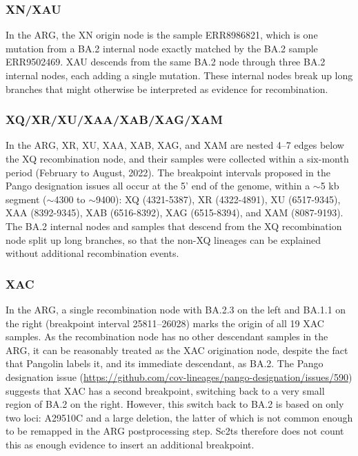 \documentclass[12pt]{article}
\begin{document}
\subsubsection{XN/XAU}
\label{sec:dd_xn}

In the ARG, the XN origin node is the sample ERR8986821,
which is one mutation from a BA.2 internal node
exactly matched by the BA.2 sample ERR9502469.
XAU descends from the same BA.2 node through three BA.2 internal nodes,
each adding a single mutation.
These internal nodes break up long branches
that might otherwise be interpreted as evidence for recombination.

\subsubsection{XQ/XR/XU/XAA/XAB/XAG/XAM}
\label{sec:dd_xq}

In the ARG, XR, XU, XAA, XAB, XAG, and XAM
are nested 4--7 edges below the XQ recombination node,
and their samples were collected within a six-month period (February to August, 2022).
The breakpoint intervals proposed in the Pango designation issues
all occur at the 5' end of the genome,
within a $\sim$5 kb segment ($\sim$4300 to $\sim$9400):
XQ (4321-5387), %
XR (4322-4891), %
XU (6517-9345), %
XAA (8392-9345),  %
XAB (6516-8392),  %
XAG (6515-8394),  %
and XAM (8087-9193).  %
The BA.2 internal nodes and samples
that descend from the XQ recombination node
split up long branches,
so that the non-XQ lineages can be explained
without additional recombination events.

\subsubsection{XAC}
\label{sec:dd_xac}

In the ARG, a single recombination node
with BA.2.3 on the left and BA.1.1 on the right (breakpoint interval 25811--26028)
marks the origin of all 19 XAC samples.
As the recombination node has no other descendant samples in the ARG,
it can be reasonably treated as the XAC origination node,
despite the fact that Pangolin labels it, and its immediate descendant, as BA.2.
The Pango designation issue
(\url{https://github.com/cov-lineages/pango-designation/issues/590})
suggests that XAC has a second breakpoint,
switching back to a very small region of BA.2 on the right.
However, this switch back to BA.2 is based on only two loci:
A29510C and a large deletion,
the latter of which is not common enough
to be remapped in the ARG postprocessing step.
Sc2ts therefore does not count this as
enough evidence to insert an additional breakpoint.
\end{document}

